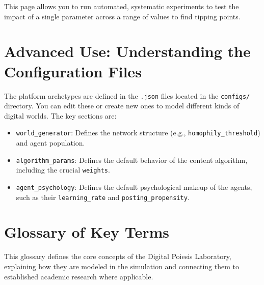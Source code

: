 \documentclass[11pt, a4paper]{article}
\begin{document}
This page allows you to run automated, systematic experiments to test the impact of a single parameter across a range of values to find tipping points.

\section{Advanced Use: Understanding the Configuration Files}
The platform archetypes are defined in the \texttt{.json} files located in the \texttt{configs/} directory. You can edit these or create new ones to model different kinds of digital worlds. The key sections are:
\begin{itemize}
    \item \texttt{world\_generator}: Defines the network structure (e.g., \texttt{homophily\_threshold}) and agent population.
    \item \texttt{algorithm\_params}: Defines the default behavior of the content algorithm, including the crucial \texttt{weights}.
    \item \texttt{agent\_psychology}: Defines the default psychological makeup of the agents, such as their \texttt{learning\_rate} and \texttt{posting\_propensity}.
\end{itemize}

\section{Glossary of Key Terms}

This glossary defines the core concepts of the Digital Poiesis Laboratory, explaining how they are modeled in the simulation and connecting them to established academic research where applicable.
\end{document}
